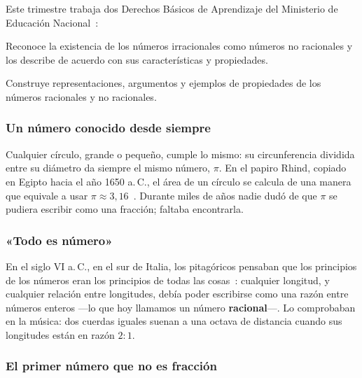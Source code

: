 \documentclass[11pt]{article}
\begin{document}
Este trimestre trabaja dos Derechos Básicos de Aprendizaje del Ministerio de
Educación Nacional~\cite{mendba}:

\begin{dba}
Reconoce la existencia de los números irracionales como números no
racionales y los describe de acuerdo con sus características y propiedades.
\end{dba}

\begin{dba}
Construye representaciones, argumentos y ejemplos de propiedades de los
números racionales y no racionales.
\end{dba}


\subsubsection*{Un número conocido desde siempre}

Cualquier círculo, grande o pequeño, cumple lo mismo: su circunferencia
dividida entre su diámetro da siempre el mismo número, $\pi$. En el papiro
Rhind, copiado en Egipto hacia el año 1650 a.\,C., el área de un círculo se
calcula de una manera que equivale a usar $\pi \approx 3{,}16$~\cite{mactutorpi}.
Durante miles de años nadie dudó de que $\pi$ se pudiera escribir como una
fracción; faltaba encontrarla.

\subsubsection*{«Todo es número»}

En el siglo VI a.\,C., en el sur de Italia, los pitagóricos pensaban que los
principios de los números eran los principios de todas las
cosas~\cite{aristoteles}: cualquier longitud, y cualquier relación entre
longitudes, debía poder escribirse como una razón entre números enteros —lo
que hoy llamamos un número \textbf{racional}—. Lo comprobaban en la música:
dos cuerdas iguales suenan a una octava de distancia cuando sus longitudes
están en razón $2:1$.

\subsubsection*{El primer número que no es fracción}
\end{document}
